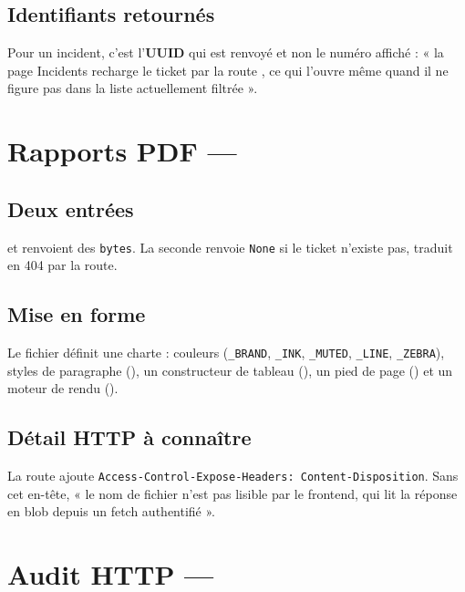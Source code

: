\subsection*{Identifiants retournés}
Pour un incident, c'est l'\textbf{UUID} qui est renvoyé et non le numéro
affiché : « la page Incidents recharge le ticket par la route
, ce qui l'ouvre même quand il ne figure pas dans la
liste actuellement filtrée ».

\section{Rapports PDF --- }

\subsection*{Deux entrées}
 et
 renvoient des
\texttt{bytes}. La seconde renvoie \texttt{None} si le ticket n'existe pas,
traduit en 404 par la route.

\subsection*{Mise en forme}
Le fichier définit une charte : couleurs (\texttt{\_BRAND}, \texttt{\_INK},
\texttt{\_MUTED}, \texttt{\_LINE}, \texttt{\_ZEBRA}), styles de paragraphe
(), un constructeur de tableau (), un pied de page
() et un moteur de rendu ().

\subsection*{Détail HTTP à connaître}
La route ajoute \texttt{Access-Control-Expose-Headers: Content-Disposition}.
Sans cet en-tête, « le nom de fichier n'est pas lisible par le frontend, qui lit
la réponse en blob depuis un fetch authentifié ».

\section{Audit HTTP --- }

\subsection*{}

